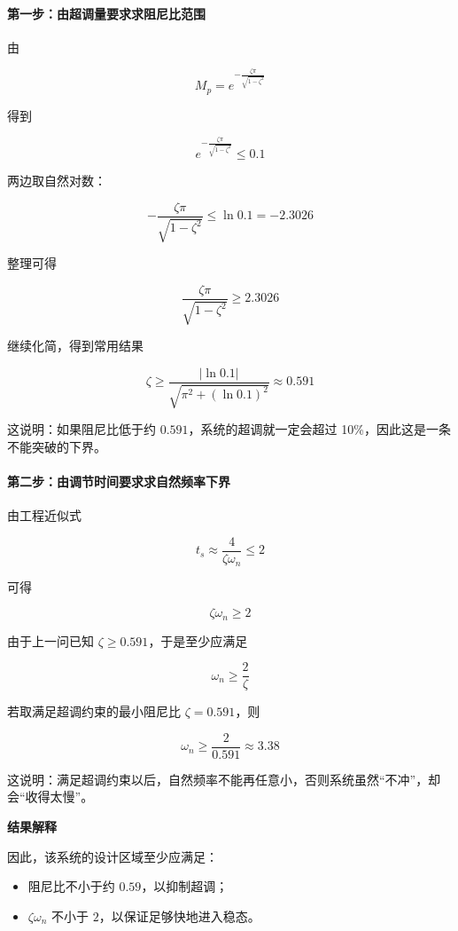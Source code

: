 \documentclass[
  11pt]{article}
\providecommand{\tightlist}{%
  \setlength{\itemsep}{0pt}\setlength{\parskip}{0pt}}
\begin{document}
\paragraph{第一步：由超调量要求求阻尼比范围}\label{ux7b2cux4e00ux6b65ux7531ux8d85ux8c03ux91cfux8981ux6c42ux6c42ux963bux5c3cux6bd4ux8303ux56f4}

由

\[
M_p = e^{-\frac{\zeta\pi}{\sqrt{1-\zeta^2}}}
\]

得到

\[
e^{-\frac{\zeta\pi}{\sqrt{1-\zeta^2}}} \le 0.1
\]

两边取自然对数：

\[
-\frac{\zeta\pi}{\sqrt{1-\zeta^2}} \le \ln 0.1 = -2.3026
\]

整理可得

\[
\frac{\zeta\pi}{\sqrt{1-\zeta^2}} \ge 2.3026
\]

继续化简，得到常用结果

\[
\zeta \ge \frac{|\ln 0.1|}{\sqrt{\pi^2 + (\ln 0.1)^2}} \approx 0.591
\]

这说明：如果阻尼比低于约 \(0.591\)，系统的超调就一定会超过
10\%，因此这是一条不能突破的下界。

\paragraph{第二步：由调节时间要求求自然频率下界}\label{ux7b2cux4e8cux6b65ux7531ux8c03ux8282ux65f6ux95f4ux8981ux6c42ux6c42ux81eaux7136ux9891ux7387ux4e0bux754c}

由工程近似式

\[
t_s \approx \frac{4}{\zeta\omega_n} \le 2
\]

可得

\[
\zeta\omega_n \ge 2
\]

由于上一问已知 \(\zeta \ge 0.591\)，于是至少应满足

\[
\omega_n \ge \frac{2}{\zeta}
\]

若取满足超调约束的最小阻尼比 \(\zeta = 0.591\)，则

\[
\omega_n \ge \frac{2}{0.591} \approx 3.38
\]

这说明：满足超调约束以后，自然频率不能再任意小，否则系统虽然``不冲''，却会``收得太慢''。

\textbf{结果解释}

因此，该系统的设计区域至少应满足：

\begin{itemize}
\tightlist
\item
  阻尼比不小于约 \(0.59\)，以抑制超调；
\item
  \(\zeta\omega_n\) 不小于 \(2\)，以保证足够快地进入稳态。
\end{itemize}
\end{document}
